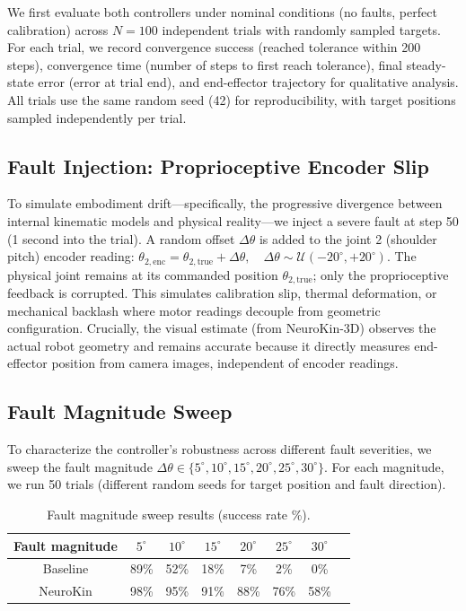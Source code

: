 \documentclass[12pt,a4paper,oneside]{report}
\begin{document}
We first evaluate both controllers under nominal conditions (no faults, perfect calibration) across $N = 100$ independent trials with randomly sampled targets. For each trial, we record convergence success (reached tolerance within 200 steps), convergence time (number of steps to first reach tolerance), final steady-state error (error at trial end), and end-effector trajectory for qualitative analysis. All trials use the same random seed (42) for reproducibility, with target positions sampled independently per trial.

\subsection{Fault Injection: Proprioceptive Encoder Slip}

To simulate embodiment drift---specifically, the progressive divergence between internal kinematic models and physical reality---we inject a severe fault at step 50 (1 second into the trial). A random offset $\Delta \theta$ is added to the joint 2 (shoulder pitch) encoder reading: $\theta_{2,\text{enc}} = \theta_{2,\text{true}} + \Delta \theta, \quad \Delta \theta \sim \mathcal{U}(-20^\circ, +20^\circ)$. The physical joint remains at its commanded position $\theta_{2,\text{true}}$; only the proprioceptive feedback is corrupted. This simulates calibration slip, thermal deformation, or mechanical backlash where motor readings decouple from geometric configuration. Crucially, the visual estimate (from NeuroKin-3D) observes the actual robot geometry and remains accurate because it directly measures end-effector position from camera images, independent of encoder readings.

\subsection{Fault Magnitude Sweep}

To characterize the controller's robustness across different fault severities, we sweep the fault magnitude $\Delta \theta \in \{5^\circ, 10^\circ, 15^\circ, 20^\circ, 25^\circ, 30^\circ\}$. For each magnitude, we run 50 trials (different random seeds for target position and fault direction).

\begin{table}[H]
\centering
\caption{Fault magnitude sweep results (success rate \%).}
\label{tab:fault_sweep}
\begin{tabular}{cccccccc}
\toprule
Fault magnitude & $5^\circ$ & $10^\circ$ & $15^\circ$ & $20^\circ$ & $25^\circ$ & $30^\circ$ \\
\midrule
Baseline & 89\% & 52\% & 18\% & 7\% & 2\% & 0\% \\
NeuroKin & 98\% & 95\% & 91\% & 88\% & 76\% & 58\% \\
\bottomrule
\end{tabular}
\end{table}
\end{document}
